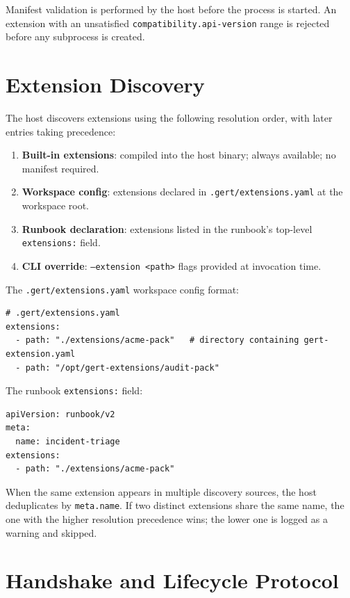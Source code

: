 Manifest validation is performed by the host before the process is started.
An extension with an unsatisfied \texttt{compatibility.api-version} range is
rejected before any subprocess is created.

\section{Extension Discovery}
\label{sec:ext-discovery}

The host discovers extensions using the following resolution order, with later
entries taking precedence:

\begin{enumerate}
  \item \textbf{Built-in extensions}: compiled into the host binary; always
        available; no manifest required.
  \item \textbf{Workspace config}: extensions declared in
        \texttt{.gert/extensions.yaml} at the workspace root.
  \item \textbf{Runbook declaration}: extensions listed in the runbook's
        top-level \texttt{extensions:} field.
  \item \textbf{CLI override}: \texttt{--extension <path>} flags provided at
        invocation time.
\end{enumerate}

The \texttt{.gert/extensions.yaml} workspace config format:

\begin{verbatim}
# .gert/extensions.yaml
extensions:
  - path: "./extensions/acme-pack"   # directory containing gert-extension.yaml
  - path: "/opt/gert-extensions/audit-pack"
\end{verbatim}

The runbook \texttt{extensions:} field:

\begin{verbatim}
apiVersion: runbook/v2
meta:
  name: incident-triage
extensions:
  - path: "./extensions/acme-pack"
\end{verbatim}

When the same extension appears in multiple discovery sources, the host
deduplicates by \texttt{meta.name}.  If two distinct extensions share the same
name, the one with the higher resolution precedence wins; the lower one is
logged as a warning and skipped.

\section{Handshake and Lifecycle Protocol}
\label{sec:ext-handshake}

